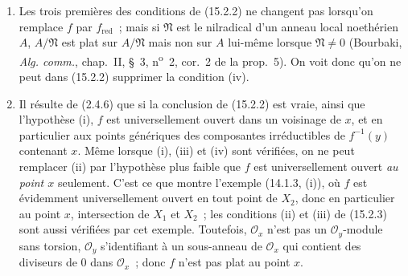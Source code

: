 \begin{remarks}[15.2.4]
\label{IV.15.2.4-fr}
\begin{enumerate}[label=(\roman*)]
  \item Les trois premières des conditions de (15.2.2) ne changent pas lorsqu'on
  remplace $f$ par $f_{\mathrm{red}}$~; mais si $\mathfrak N$ est le nilradical
  d'un anneau local noethérien $A$, $A/\mathfrak N$ est plat sur $A/\mathfrak N$
  mais non sur $A$ lui-même lorsque $\mathfrak N\ne0$ (Bourbaki,
  \emph{Alg. comm.}, chap.~II, \S~3, n\textsuperscript{o}~2, cor.~2 de la
  prop.~5). On voit donc qu'on ne peut dans (15.2.2) supprimer la condition (iv).

  \item Il résulte de (2.4.6) que si la conclusion de (15.2.2) est vraie, ainsi
  que l'hypothèse (i), $f$ est universellement ouvert dans un voisinage de $x$,
  et en particulier aux points génériques des composantes irréductibles de
  $f^{-1}(y)$ contenant $x$. Même lorsque (i), (iii) et (iv) sont vérifiées, on
  ne peut remplacer (ii) par l'hypothèse plus faible que $f$ est universellement
  ouvert \emph{au point $x$} seulement. C'est ce que montre l'exemple
  (14.1.3, (i)), où $f$ est évidemment universellement ouvert en tout point de
  $X_2$, donc en particulier au point $x$, intersection de $X_1$ et $X_2$~; les
  conditions (ii) et (iii) de (15.2.3) sont aussi vérifiées par cet exemple.
  Toutefois, $\mathcal O_x$ n'est pas un $\mathcal O_y$-module sans torsion,
  $\mathcal O_y$ s'identifiant à un sous-anneau de $\mathcal O_x$ qui contient
  des diviseurs de $0$ dans $\mathcal O_x$~; donc $f$ n'est pas plat au point $x$.


\end{enumerate}
\end{remarks}
